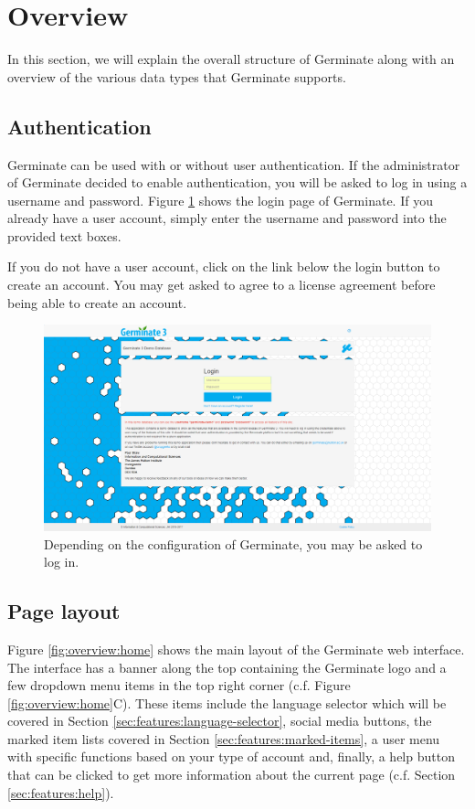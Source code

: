 \section{Overview}
In this section, we will explain the overall structure of Germinate along with an overview of the various data types that Germinate supports.

\subsection{Authentication}
Germinate can be used with or without user authentication. If the administrator of Germinate decided to enable authentication, you will be asked to log in using a username and password. Figure \ref{fig:overview:login} shows the login page of Germinate. If you already have a user account, simply enter the username and password into the provided text boxes.

If you do not have a user account, click on the link below the login button to create an account. You may get asked to agree to a license agreement before being able to create an account.

\begin{figure}
	\centering
	\includegraphics[width=0.85\linewidth]{img/overview/login.png}
	\caption{Depending on the configuration of Germinate, you may be asked to log in.}
	\label{fig:overview:login}
\end{figure}

\subsection{Page layout}
Figure \ref{fig:overview:home} shows the main layout of the Germinate web interface. The interface has a banner along the top containing the Germinate logo and a few dropdown menu items in the top right corner (c.f. Figure \ref{fig:overview:home}C). These items include the language selector which will be covered in Section \ref{sec:features:language-selector}, social media buttons, the marked item lists covered in Section \ref{sec:features:marked-items}, a user menu with specific functions based on your type of account and, finally, a help button that can be clicked to get more information about the current page (c.f. Section \ref{sec:features:help}).

